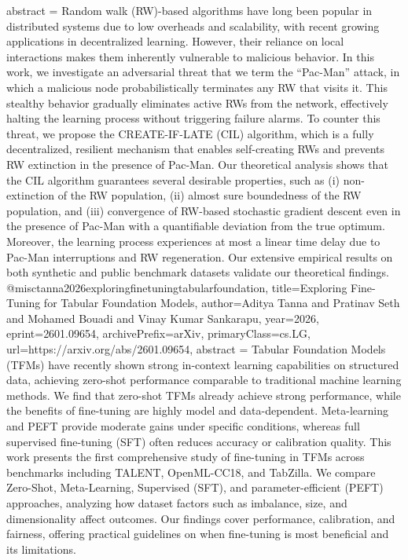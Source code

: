 {      abstract = {Random walk (RW)-based algorithms have long been popular in distributed systems due to low overheads and scalability, with recent growing applications in decentralized learning. However, their reliance on local interactions makes them inherently vulnerable to malicious behavior. In this work, we investigate an adversarial threat that we term the ``Pac-Man'' attack, in which a malicious node probabilistically terminates any RW that visits it. This stealthy behavior gradually eliminates active RWs from the network, effectively halting the learning process without triggering failure alarms. To counter this threat, we propose the CREATE-IF-LATE (CIL) algorithm, which is a fully decentralized, resilient mechanism that enables self-creating RWs and prevents RW extinction in the presence of Pac-Man. Our theoretical analysis shows that the CIL algorithm guarantees several desirable properties, such as (i) non-extinction of the RW population, (ii) almost sure boundedness of the RW population, and (iii) convergence of RW-based stochastic gradient descent even in the presence of Pac-Man with a quantifiable deviation from the true optimum. Moreover, the learning process experiences at most a linear time delay due to Pac-Man interruptions and RW regeneration. Our extensive empirical results on both synthetic and public benchmark datasets validate our theoretical findings.}
}@misc{tanna2026exploringfinetuningtabularfoundation,
      title={Exploring Fine-Tuning for Tabular Foundation Models}, 
      author={Aditya Tanna and Pratinav Seth and Mohamed Bouadi and Vinay Kumar Sankarapu},
      year={2026},
      eprint={2601.09654},
      archivePrefix={arXiv},
      primaryClass={cs.LG},
      url={https://arxiv.org/abs/2601.09654},
      abstract = {Tabular Foundation Models (TFMs) have recently shown strong in-context learning capabilities on structured data, achieving zero-shot performance comparable to traditional machine learning methods. We find that zero-shot TFMs already achieve strong performance, while the benefits of fine-tuning are highly model and data-dependent. Meta-learning and PEFT provide moderate gains under specific conditions, whereas full supervised fine-tuning (SFT) often reduces accuracy or calibration quality. This work presents the first comprehensive study of fine-tuning in TFMs across benchmarks including TALENT, OpenML-CC18, and TabZilla. We compare Zero-Shot, Meta-Learning, Supervised (SFT), and parameter-efficient (PEFT) approaches, analyzing how dataset factors such as imbalance, size, and dimensionality affect outcomes. Our findings cover performance, calibration, and fairness, offering practical guidelines on when fine-tuning is most beneficial and its limitations.}
}

